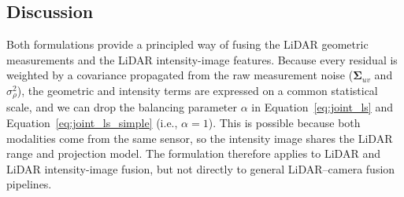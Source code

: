 \subsection{Discussion}
Both formulations provide a principled way of fusing the LiDAR geometric measurements and the LiDAR intensity-image features. Because every residual is weighted by a covariance propagated from the raw measurement noise ($\bm{\Sigma}_{uv}$ and $\sigma_{\rho}^2$), the geometric and intensity terms are expressed on a common statistical scale, and we can drop the balancing parameter $\alpha$ in Equation~\eqref{eq:joint_ls} and Equation~\eqref{eq:joint_ls_simple} (i.e., $\alpha=1$). This is possible because both modalities come from the same sensor, so the intensity image shares the LiDAR range and projection model. The formulation therefore applies to LiDAR and LiDAR intensity-image fusion, but not directly to general LiDAR--camera fusion pipelines.
